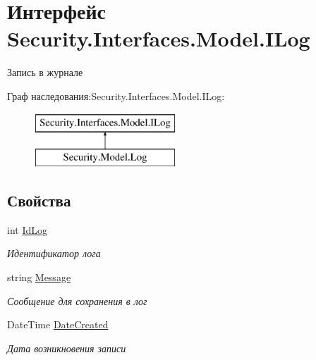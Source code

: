 \hypertarget{interface_security_1_1_interfaces_1_1_model_1_1_i_log}{}\section{Интерфейс Security.\+Interfaces.\+Model.\+I\+Log}
\label{interface_security_1_1_interfaces_1_1_model_1_1_i_log}


Запись в журнале  


Граф наследования\+:Security.\+Interfaces.\+Model.\+I\+Log\+:\begin{figure}[H]
\begin{center}
\leavevmode
\includegraphics[height=2.000000cm]{d2/d73/interface_security_1_1_interfaces_1_1_model_1_1_i_log}
\end{center}
\end{figure}
\subsection*{Свойства}
\begin{DoxyCompactItemize}
\item 
int \hyperlink{interface_security_1_1_interfaces_1_1_model_1_1_i_log_a2fe9bcc8e548f0544293303b5cb8f277}{Id\+Log}
\begin{DoxyCompactList}\small\item\em Идентификатор лога \end{DoxyCompactList}\item 
string \hyperlink{interface_security_1_1_interfaces_1_1_model_1_1_i_log_aa5520ef5a3b0ff3668c06779cb72cb0a}{Message}
\begin{DoxyCompactList}\small\item\em Сообщение для сохранения в лог \end{DoxyCompactList}\item 
Date\+Time \hyperlink{interface_security_1_1_interfaces_1_1_model_1_1_i_log_a683d962c505d5ef45478a6abf33d8586}{Date\+Created}
\begin{DoxyCompactList}\small\item\em Дата возникновения записи \end{DoxyCompactList}\end{DoxyCompactItemize}


